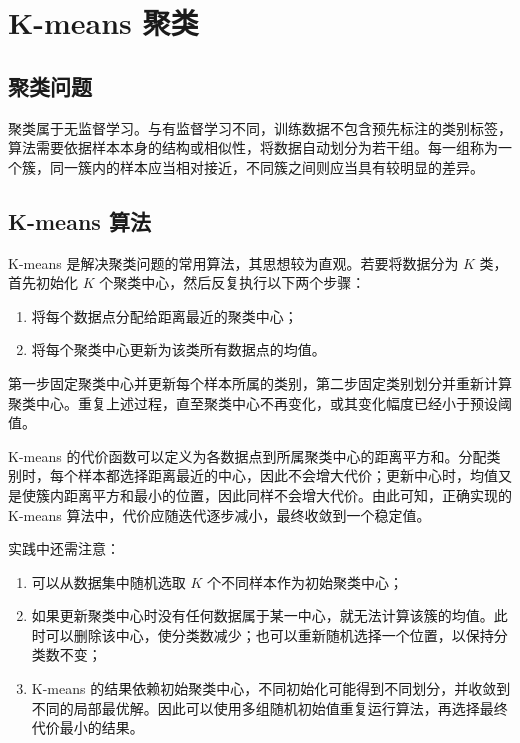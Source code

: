 \section{K-means 聚类}
\label{sec:chapter11}

\subsection{聚类问题}

聚类属于无监督学习。与有监督学习不同，训练数据不包含预先标注的类别标签，算法需要依据样本本身的结构或相似性，将数据自动划分为若干组。每一组称为一个簇，同一簇内的样本应当相对接近，不同簇之间则应当具有较明显的差异。


\subsection{K-means 算法}

K-means 是解决聚类问题的常用算法，其思想较为直观。若要将数据分为 $K$ 类，首先初始化 $K$ 个聚类中心，然后反复执行以下两个步骤：
\begin{enumerate}
    \item 将每个数据点分配给距离最近的聚类中心；
    \item 将每个聚类中心更新为该类所有数据点的均值。
\end{enumerate}

第一步固定聚类中心并更新每个样本所属的类别，第二步固定类别划分并重新计算聚类中心。重复上述过程，直至聚类中心不再变化，或其变化幅度已经小于预设阈值。

K-means 的代价函数可以定义为各数据点到所属聚类中心的距离平方和。分配类别时，每个样本都选择距离最近的中心，因此不会增大代价；更新中心时，均值又是使簇内距离平方和最小的位置，因此同样不会增大代价。由此可知，正确实现的 K-means 算法中，代价应随迭代逐步减小，最终收敛到一个稳定值。

实践中还需注意：
\begin{enumerate}
    \item 可以从数据集中随机选取 $K$ 个不同样本作为初始聚类中心；
    \item 如果更新聚类中心时没有任何数据属于某一中心，就无法计算该簇的均值。此时可以删除该中心，使分类数减少；也可以重新随机选择一个位置，以保持分类数不变；
    \item K-means 的结果依赖初始聚类中心，不同初始化可能得到不同划分，并收敛到不同的局部最优解。因此可以使用多组随机初始值重复运行算法，再选择最终代价最小的结果。
\end{enumerate}


